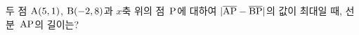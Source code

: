 두 점 $\mathrm{A}(5{,}\mkern3mu\mathopen{}1)$, $\mathrm{B}(-2{,}\mkern3mu\mathopen{}8)$과 $x$축 위의 점~$\mathrm{P}$에 대하여 $|\overline{\mathrm{AP}}-\overline{\mathrm{BP}}|$의 값이 최대일 때, 선분~$\mathrm{AP}$의 길이는?
